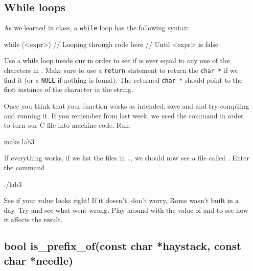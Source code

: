 \documentclass{tufte-handout}
\begin{document}
\subsection{While loops}
As we learned in class, a \texttt{while} loop has the following
syntax:

\begin{Code}
    while (<expr>) {
        // Looping through code here
        // Until <expr> is false
    }
\end{Code}

Use a while loop inside our  in order to see if
 is ever equal to any one of the charcters in
.
Make sure to use a \texttt{return} statement to return the
\verb!char *! if we find it (or a \texttt{NULL} if nothing is found). The returned
\verb!char *! should point to the first instance of the character in the string.

Once you think that your function works as intended, save and and try
compiling and running it. If you
remember from last week, we used the  command in
order to turn our C file into machine code. Run:
\begin{CmdLine*}
  \C make lab3\\
\end{CmdLine*}
If everything works, if we list the files in \texttt{.}, we should now see a file called .  Enter the command
\begin{CmdLine*}
  \C ./lab3\\
\end{CmdLine*}
See if your value looks right!  If it doesn't, don't worry, Rome wasn't built in a day. Try and see what went wrong.  Play around with the value of  and  to see how it affects the result.

\subsection{{bool is\_prefix\_of(const char *haystack,
      const char *needle)}}
\end{document}
